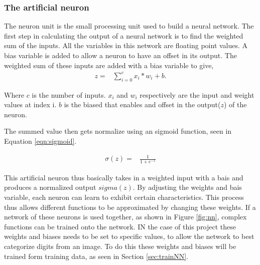 \subsubsection{The artificial neuron}
The neuron unit is the small processing unit used to build a neural network. The first step in calculating the output of a neural network is to find the weighted sum of the inputs. All the variables in this network are floating point values. A bias variable is added to allow a neuron to have an offset in  its output. The weighted sum of these inputs are added with a bias variable to give,
\begin{align}
  z =  &\displaystyle{\sum_{i=0}^{c} x_{i}*w_{i} + b}.
\label{eqn:nnOut}
\end{align}


Where $c$ is the number of inputs. $x_{i}$ and $w_{i}$ respectively are the input and weight values at index i. $b$ is the biased that enables and offset in the output($z$) of the neuron.

The summed value then gets normalize using an sigmoid function, seen in Equation \ref{eqn:sigmoid}.

\begin{align}
  \sigma(z) =  &\displaystyle{\frac{1}{1 + e^{-z}}}
\label{eqn:sigmoid}
\end{align}

This artificial neuron thus basically takes in a weighted input with a bais and produces a normalized output $sigma(z)$. By adjusting the weights and bais variable, each neuron can learn to exhibit certain characteristics. This process thus allows different functions to be approximated by changing these weights. If a network of these neurons is used together, as shown in Figure \ref{fig:nn}, complex functions can be trained onto the network. IN the case of this project these weights and biases needs to be set to specific values, to allow the network to best categorize digits from an image. To do this these weights and biases will be trained form training data, as seen in Section \ref{sec:trainNN}.

